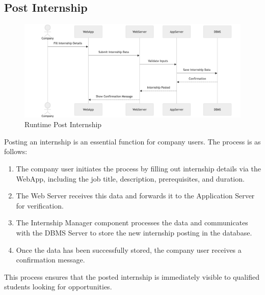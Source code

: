 \subsection{Post Internship}
\label{subsec:post_internship}
\begin{figure}[H]
    \begin{center}
        \includegraphics[width=0.82\linewidth]{JhaBhatiaSharma/imagesDD/PostInternshipRuntime.png}
        \caption{Runtime Post Internship}
        \label{fig:postinternshpruntime}%
    \end{center}
\end{figure}
Posting an internship is an essential function for company users. The process is as follows:
\begin{enumerate}
    \item The company user initiates the process by filling out internship details via the WebApp, including the job title, description, prerequisites, and duration.
    \item The Web Server receives this data and forwards it to the Application Server for verification.
    \item The Internship Manager component processes the data and communicates with the DBMS Server to store the new internship posting in the database.
    \item Once the data has been successfully stored, the company user receives a confirmation message.
\end{enumerate}
This process ensures that the posted internship is immediately visible to qualified students looking for opportunities.

